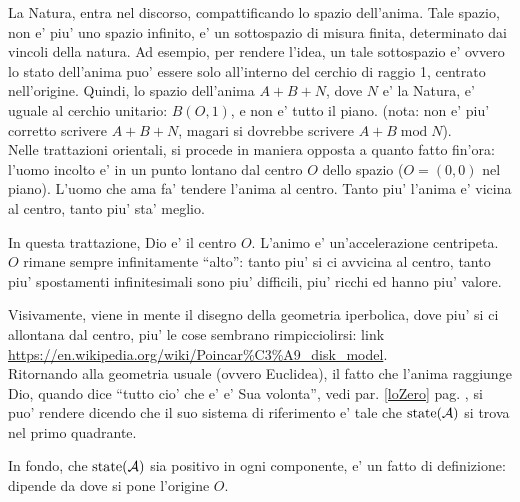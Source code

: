 La Natura, entra nel discorso, compattificando lo spazio dell'anima. Tale spazio, non e' piu' uno spazio infinito, e' un sottospazio di misura finita, determinato dai vincoli della natura. Ad esempio, per rendere l'idea, un tale sottospazio e' 
ovvero lo stato dell'anima puo' essere solo all'interno del cerchio di raggio 1, centrato nell'origine. Quindi, lo spazio dell'anima $A+B+N$, dove $N$ e' la Natura, e' uguale al cerchio unitario: $B(O,1)$, e non e' tutto il piano. (nota: non e' piu' corretto scrivere $A+B+N$, magari si dovrebbe scrivere $A+B\;\textrm{mod}\;N$).\\

Nelle trattazioni orientali, si procede in maniera opposta a quanto fatto fin'ora: l'uomo incolto e' in un punto lontano dal centro $O$ dello spazio ($O=(0,0)$ nel piano). L'uomo che ama fa' tendere l'anima al centro. Tanto piu' l'anima e' vicina al centro, tanto piu' sta' meglio.

In questa trattazione, Dio e' il centro $O$. L'animo e' un'accelerazione centripeta. $O$ rimane sempre infinitamente ``alto'': tanto piu' si ci avvicina al centro, tanto piu' spostamenti infinitesimali sono piu' difficili, piu' ricchi ed hanno piu' valore.

Visivamente, viene in mente il disegno della geometria iperbolica, dove piu' si ci allontana dal centro, piu' le cose sembrano rimpicciolirsi: link  \url{https://en.wikipedia.org/wiki/Poincar\%C3\%A9\_disk\_model}.\\



Ritornando alla geometria usuale (ovvero Euclidea), il fatto che l'anima raggiunge Dio, quando dice ``tutto cio' che e' e' Sua volonta'', vedi par. \ref{loZero} pag. \pageref{loZero}, si puo' rendere dicendo che il suo sistema di riferimento e' tale che $\textrm{state}(\mathcal{A})$ si trova nel primo quadrante. 

In fondo, che $\textrm{state}(\mathcal{A})$ sia positivo in ogni componente, e' un fatto di definizione: dipende da dove si pone l'origine $O$.

